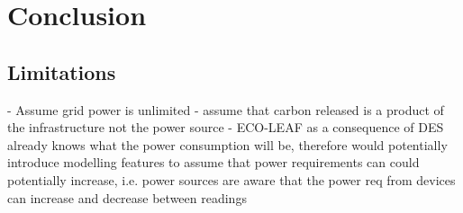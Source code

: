 \documentclass{l4proj}
\begin{document}
%
%
%



\chapter{Conclusion}

\section{Limitations}
- Assume grid power is unlimited
- assume that carbon released is a product of the infrastructure not the power source
- ECO-LEAF as a consequence of DES already knows what the power consumption will be, therefore would potentially introduce modelling features to assume that power requirements can could potentially increase, i.e. power sources are aware that the power req from devices can increase and decrease between readings
\end{document}
